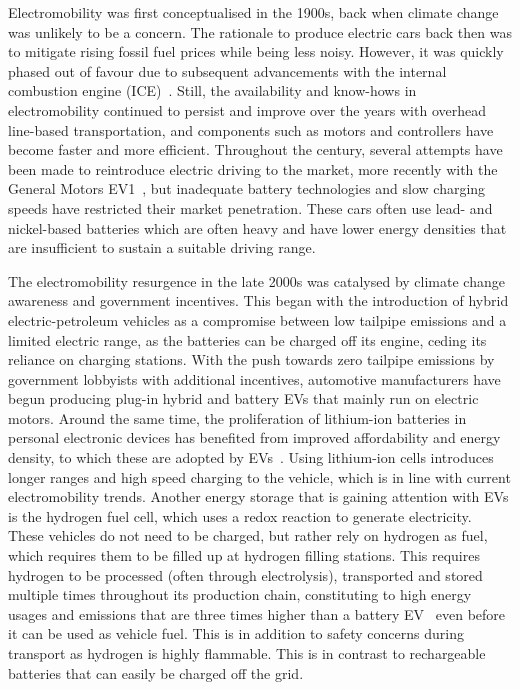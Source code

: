 Electromobility was first conceptualised in the 1900s, back when climate change was unlikely to be a concern. The rationale to produce electric cars back then was to mitigate rising fossil fuel prices while being less noisy. However, it was quickly phased out of favour due to subsequent advancements with the internal combustion engine (ICE)~\cite{kirsch_electric_2000}. Still, the availability and know-hows in electromobility continued to persist and improve over the years with overhead line-based transportation, and components such as motors and controllers have become faster and more efficient. Throughout the century, several attempts have been made to reintroduce electric driving to the market, more recently with the General Motors EV1~\cite{johnson_environmental_1999}, but inadequate battery technologies and slow charging speeds have restricted their market penetration. These cars often use lead- and nickel-based batteries which are often heavy and have lower energy densities that are insufficient to sustain a suitable driving range.

The electromobility resurgence in the late 2000s was catalysed by climate change awareness and government incentives. This began with the introduction of hybrid electric-petroleum vehicles as a compromise between low tailpipe emissions and a limited electric range, as the batteries can be charged off its engine, ceding its reliance on charging stations. With the push towards zero tailpipe emissions by government lobbyists with additional incentives, automotive manufacturers have begun producing plug-in hybrid and battery EVs that mainly run on electric motors. Around the same time, the proliferation of lithium-ion batteries in personal electronic devices has benefited from improved affordability and energy density, to which these are adopted by EVs~\cite{hannan_review_2017}. Using lithium-ion cells introduces longer ranges and high speed charging to the vehicle, which is in line with current electromobility trends. Another energy storage that is gaining attention with EVs is the hydrogen fuel cell, which uses a redox reaction to generate electricity. These vehicles do not need to be charged, but rather rely on hydrogen as fuel, which requires them to be filled up at hydrogen filling stations. This requires hydrogen to be processed (often through electrolysis), transported and stored multiple times throughout its production chain, constituting to high energy usages and emissions that are three times higher than a battery EV~\cite{smit_where_2018} even before it can be used as vehicle fuel. This is in addition to safety concerns during transport as hydrogen is highly flammable. This is in contrast to rechargeable batteries that can easily be charged off the grid.

